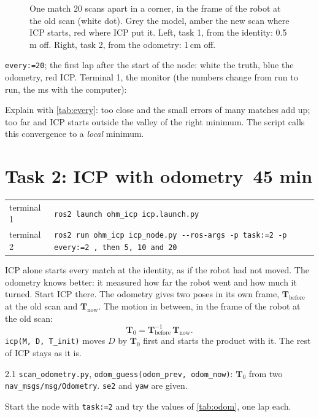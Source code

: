 \documentclass[11pt,a4paper,parskip=half]{scrartcl}
\makeatletter
\newcommand{\thema}[1]{\texttt{#1}}
\newcommand{\datei}[1]{\texttt{#1}}
\newcommand{\minutes}[1]{\hfill{\normalsize\mdseries\color{ohmgrey}\faClock[regular]~#1 min}}
\newcommand{\matsym}[1]{\mathbf{#1}}
\newcommand{\running}[2]{\begin{tcolorbox}[base, colback=black!3, borderline west={2.5pt}{0pt}{ohmgrey},
        title={\faTerminal~Running}, coltitle=ohmgrey, colbacktitle=black!3, fonttitle=\small\bfseries,
        toptitle=2pt, bottomtitle=0pt, fontupper=\small]
  \begin{tabularx}{\linewidth}{@{}>{\color{ohmgrey}}l >{\raggedright\arraybackslash}X@{}}
    terminal 1 & \texttt{ros2 launch ohm\_icp icp.launch.py#1} \\
    terminal 2 & \texttt{ros2 run ohm\_icp icp\_node.py -\kern0pt-ros-args #2}
  \end{tabularx}
\end{tcolorbox}}
\newcommand{\expected}[2][]{\begin{seebox}
  \centering\resizebox{0.46\linewidth}{!}{}\par\smallskip
  \raggedright{\footnotesize\color{ohmgrey}#1the first lap after the start of the node: white the truth,
    blue the odometry, red ICP. Terminal 1, the monitor (the numbers change from run to run, the ms with the
    computer):}
  
\end{seebox}}
\makeatother
\begin{document}
\begin{figure}[ht]
  \centering
  \resizebox{0.92\linewidth}{!}{}
  \caption{One match 20 scans apart in a corner, in the frame of the robot at the old scan (white dot). Grey
    the model, amber the new scan where ICP starts, red where ICP put it. Left, task 1, from the identity:
    0.5\,m off. Right, task 2, from the odometry: 1\,cm off.}
  \label{fig:match}
\end{figure}

\expected[\thema{every:=20}; ]{every20}

\begin{checkpoint}
Explain with \cref{tab:every}: too close and the small errors of many matches add up; too far and ICP starts
outside the valley of the right minimum. The script calls this convergence to a \emph{local} minimum.
\end{checkpoint}

\newpage
\section{Task 2: ICP with odometry\minutes{45}}
\label{sec:task2}
\running{}{-p task:=2 -p every:=2 \textsf{, then 5, 10 and 20}}

ICP alone starts every match at the identity, as if the robot had not moved. The odometry knows better: it
measured how far the robot went and how much it turned. Start ICP there. The odometry gives two poses in its
own frame, \(\matsym T_\text{before}\) at the old scan and \(\matsym T_\text{now}\). The motion in between,
in the frame of the robot at the old scan:
\begin{equation*}
  \matsym T_0 = \matsym T_\text{before}^{-1}\, \matsym T_\text{now} .
\end{equation*}
\thema{icp(M, D, T\_init)} moves \(D\) by \(\matsym T_0\) first and starts the product with it. The rest of
ICP stays as it is.

\begin{todo}{2.1}
\datei{scan\_odometry.py}, \thema{odom\_guess(odom\_prev, odom\_now)}: \(\matsym T_0\) from two
\thema{nav\_msgs/msg/Odometry}. \thema{se2} and \thema{yaw} are given.
\end{todo}

Start the node with \thema{task:=2} and try the values of \cref{tab:odom}, one lap each.
\end{document}
